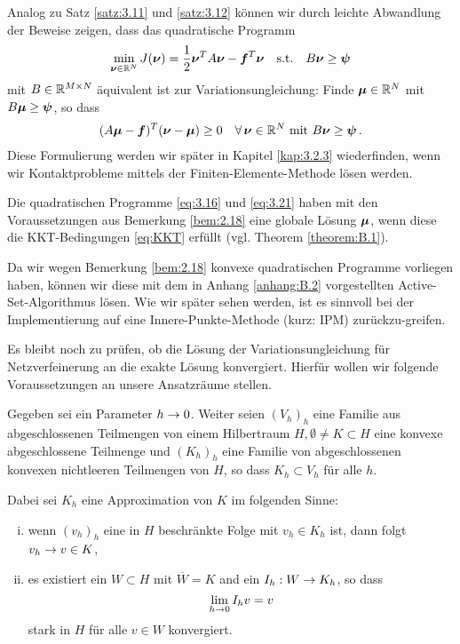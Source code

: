\begin{bem}\label{bem:3.13}
Analog zu Satz \ref{satz:3.11} und \ref{satz:3.12} können wir durch leichte Abwandlung der Beweise zeigen, dass das quadratische Programm
\begin{align}\label{eq:3.21}
	\min_{\boldsymbol\nu \in \mathbb{R}^N} J(\boldsymbol\nu) = \frac 1 2 \boldsymbol \nu^T A \boldsymbol \nu - \boldsymbol f^T \boldsymbol \nu \quad \text{s.t.} \quad B\boldsymbol\nu \ge \boldsymbol \psi
\end{align}
mit $B \in \mathbb{R}^{M\times N}$ äquivalent ist zur Variationsungleichung: Finde $\boldsymbol\mu \in \mathbb{R}^N$ mit $B\boldsymbol\mu \ge \boldsymbol \psi$, so dass
\begin{align}\label{eq:3.22}
	(A\boldsymbol\mu - \boldsymbol f)^T (\boldsymbol\nu-\boldsymbol\mu) \ge 0 \quad \forall\, \boldsymbol\nu \in \mathbb{R}^N \text{ mit } B \boldsymbol \nu \ge \boldsymbol\psi \, .
\end{align}
Diese Formulierung werden wir später in Kapitel \ref{kap:3.2.3} wiederfinden, wenn wir Kontaktprobleme mittels der Finiten-Elemente-Methode lösen werden.
\end{bem}


\begin{bem}\label{bem:3.14}
Die quadratischen Programme \eqref{eq:3.16} und \eqref{eq:3.21} haben mit den Voraussetzungen aus Bemerkung \ref{bem:2.18} eine globale Lösung $\boldsymbol\mu$, wenn diese die KKT-Bedingungen \eqref{eq:KKT} erfüllt (vgl. Theorem \ref{theorem:B.1}).
\end{bem}


Da wir wegen Bemerkung \ref{bem:2.18} konvexe quadratischen Programme vorliegen haben, können wir diese mit dem in Anhang \ref{anhang:B.2} vorgestellten Active-Set-Algorithmus lösen. Wie wir später sehen werden, ist es sinnvoll bei der Implementierung auf eine Innere-Punkte-Methode (kurz: IPM) zurückzu-greifen.

Es bleibt noch zu prüfen, ob die Lösung der Variationsungleichung für Netzverfeinerung an die exakte Lösung konvergiert. Hierfür wollen wir folgende Voraussetzungen an unsere Ansatzräume stellen.


\begin{vor}\label{vor:3.15}
Gegeben sei ein Parameter $h \rightarrow 0$. Weiter seien $(V_h)_h$ eine Familie aus abgeschlossenen Teilmengen von einem Hilbertraum $H, \emptyset \not= K \subset H$ eine konvexe abgeschlossene Teilmenge und $(K_h)_h$ eine Familie von abgeschlossenen konvexen nichtleeren Teilmengen von $H$, so dass $K_h \subset V_h$ für alle $h$.

Dabei sei $K_h$ eine Approximation von $K$ im folgenden Sinne:
\begin{enumerate}[(i)]
\item wenn $(v_h)_h$ eine in $H$ beschränkte Folge mit $v_h \in K_h$ ist, dann folgt $v_h \rightarrow v \in K$,
\item es existiert ein $W \subset H$ mit $\overline W = K$ and ein $I_h: W \rightarrow K_h$, so dass
\[
	\lim_{h\rightarrow 0} I_h v = v
\]
stark in $H$ für alle $v \in W$ konvergiert.
\end{enumerate}
\end{vor}


